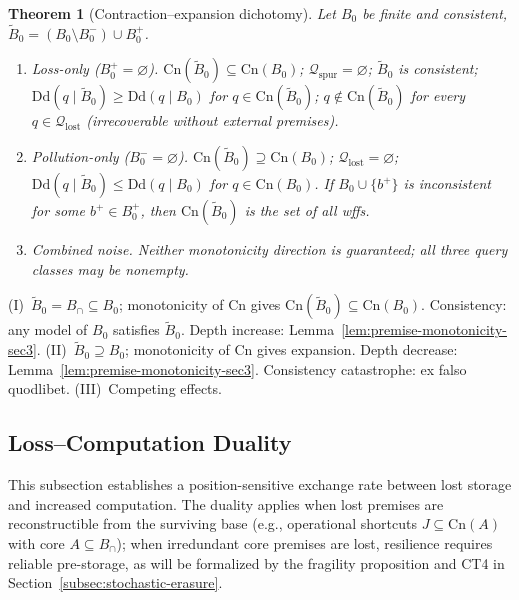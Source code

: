 \documentclass[journal]{IEEEtran}
\makeatletter
\newcommand{\Dd}{\text{Dd}}
\newcommand{\Cn}{\text{Cn}}
\newtheorem{theorem}{Theorem}[section]
\numberwithin{equation}{section}
\renewenvironment{proof}[1][\proofname]{\par
  \pushQED{\qed}%
  \normalfont \topsep6\p@\@plus6\p@\relax
  \trivlist
  \item[\hskip\labelsep
        \itshape
    #1\@addpunct{.}]\ignorespaces
}{%
  \popQED\endtrivlist\@endpefalse
}
\makeatother
\begin{document}
\begin{theorem}[Contraction--expansion dichotomy]
\label{thm:contraction-expansion}
Let $B_0$ be finite and consistent,
$\tilde B_0=(B_0\setminus B_0^-)\cup B_0^+$.

\begin{enumerate}[label=\textup{(\Roman*)}]
\item \emph{Loss-only ($B_0^+=\varnothing$).}
$\Cn(\tilde B_0)\subseteq\Cn(B_0)$;
$\mathcal{Q}_{\mathrm{spur}}=\varnothing$;
$\tilde B_0$ is consistent;
$\Dd(q\mid\tilde B_0)\ge\Dd(q\mid B_0)$ for
$q\in\Cn(\tilde B_0)$;
$q\notin\Cn(\tilde B_0)$ for every
$q\in\mathcal{Q}_{\mathrm{lost}}$
\textup{(irrecoverable without external premises)}.

\item \emph{Pollution-only ($B_0^-=\varnothing$).}
$\Cn(\tilde B_0)\supseteq\Cn(B_0)$;
$\mathcal{Q}_{\mathrm{lost}}=\varnothing$;
$\Dd(q\mid\tilde B_0)\le\Dd(q\mid B_0)$ for
$q\in\Cn(B_0)$.
If $B_0\cup\{b^+\}$ is inconsistent for some
$b^+\in B_0^+$, then $\Cn(\tilde B_0)$ is the set of all
wffs.

\item \emph{Combined noise.}
Neither monotonicity direction is guaranteed; all three query
classes may be nonempty.
\end{enumerate}
\end{theorem}

\begin{proof}
(I)~$\tilde B_0=B_\cap\subseteq B_0$; monotonicity of $\Cn$
gives $\Cn(\tilde B_0)\subseteq\Cn(B_0)$.
Consistency: any model of $B_0$ satisfies $\tilde B_0$.
Depth increase: Lemma~\ref{lem:premise-monotonicity-sec3}.
(II)~$\tilde B_0\supseteq B_0$; monotonicity of $\Cn$ gives
expansion.
Depth decrease: Lemma~\ref{lem:premise-monotonicity-sec3}.
Consistency catastrophe: ex falso quodlibet.
(III)~Competing effects.
\end{proof}

\subsection{Loss--Computation Duality}
\label{subsec:loss-computation}

This subsection establishes a position-sensitive exchange rate
between lost storage and increased computation.
The duality applies when lost premises are reconstructible from
the surviving base (e.g., operational shortcuts
$J\subseteq\Cn(A)$ with core $A\subseteq B_\cap$);
when irredundant core premises are lost, resilience requires
reliable pre-storage, as will be formalized by the fragility
proposition and CT4 in Section~\ref{subsec:stochastic-erasure}.
\end{document}
